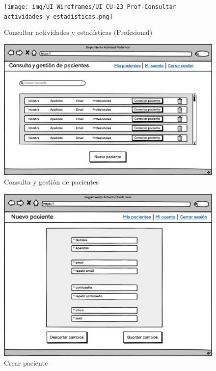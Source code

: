 \begin{figure}[h]
    \centering
    \texttt{[image: img/UI\_Wireframes/UI\_CU-23\_Prof-Consultar actividades y estadísticas.png]}
    \caption{Consultar actividades y estadísticas (Profesional)}
    \label{fig:Consultar actividades y estadísticas (Profesional)}
\end{figure}

\begin{figure}[h]
    \centering
    \includegraphics[width=1\textwidth]{img/UI_Wireframes/UI_CU-26_Consulta y gestion de pacientes.png}
    \caption{Consulta y gestión de pacientes}
    \label{fig:Consulta y gestión de pacientes}
\end{figure}

\begin{figure}[h]
    \centering
    \includegraphics[width=1\textwidth]{img/UI_Wireframes/UI_CU-28_Crear paciente.png}
    \caption{Crear paciente}
    \label{fig:Crear paciente}
\end{figure}

